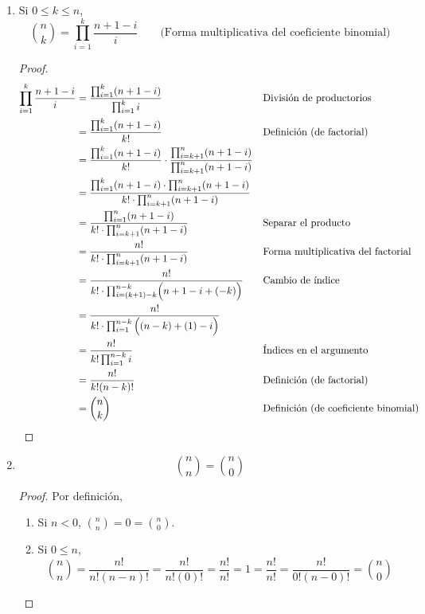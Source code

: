 \begin{enumerate}[label=\alph*)]
  \item Si $0\leq k \leq n$, \[\binom{n}{k} = \prod_{i=1}^{k} \frac{n+1-i}{i} \qquad \text{(Forma multiplicativa del coeficiente binomial)}\]
  
  \begin{proof}\leavevmode
    \begin{align*}
      \prod_{i=1}^{k} \frac{n+1-i}{i} &= \frac{\prod_{i=1}^{k} (n+1-i)}{\prod_{i=1}^{k} i} && \text{División de productorios}\\
      &= \frac{\prod_{i=1}^{k} (n+1-i)}{k!} && \text{Definición (de factorial)}\\
      &= \frac{\prod_{i=1}^{k} (n+1-i)}{k!} \cdot \frac{\prod_{i=k+1}^{n} (n+1-i)}{\prod_{i=k+1}^{n} (n+1-i)}\\
      &= \frac{\prod_{i=1}^{k} (n+1-i) \cdot \prod_{i=k+1}^{n} (n+1-i)}{k! \cdot \prod_{i=k+1}^{n} (n+1-i)}\\
      &= \frac{\prod_{i=1}^{n}(n+1-i)}{k! \cdot \prod_{i=k+1}^{n} (n+1-i)} && \text{Separar el producto}\\
      &= \frac{n!}{k! \cdot \prod_{i=k+1}^{n} (n+1-i)} && \text{Forma multiplicativa del factorial}\\
      &= \frac{n!}{k! \cdot \prod_{i=(k+1)-k}^{n-k} \Bigl(n+1-i+(-k)\Bigr)} && \text{Cambio de índice}\\
      &= \frac{n!}{k! \cdot \prod_{i=1}^{n-k} \Big((n-k)+(1)-i\Big)}\\
      &= \frac{n!}{k!\prod_{i=1}^{n-k} i} && \text{Índices en el argumento}\\
      &= \frac{n!}{k!(n-k)!} && \text{Definición (de factorial)}\\
      &= \binom{n}{k} && \text{Definición (de coeficiente binomial)}
    \end{align*}
  \end{proof}
  
  \item \[\binom{n}{n} = \binom{n}{0}\]
  \begin{proof}\leavevmode Por definición,
    \begin{enumerate}[label=\roman*)]
      \item Si $n<0$, $\binom{n}{n} = 0 = \binom{n}{0}$.
      \item Si $0\leq n$, \[\binom{n}{n} = \frac{n!}{n!(n-n)!} = \frac{n!}{n!(0)!} = \frac{n!}{n!} = 1 = \frac{n!}{n!} =\frac{n!}{0!(n-0)!} = \binom{n}{0}\]
    \end{enumerate}
  \end{proof}
  

\end{enumerate}
